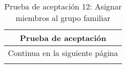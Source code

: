 \begin{longtable}{|p{6.7cm}|p{6.7cm}|}
    \caption{Prueba de aceptación 12: Asignar miembros al grupo familiar} \label{tab:prueba-12}
    \\
    \hline
    \multicolumn{2}{|c|}{\textbf{Prueba de aceptación}}                                                                                                                                                                                                                                                           \\
    \hline

    \endfirsthead

    \hline
    \endhead

    \hline
    \multicolumn{2}{|c|}{{Continua en la siguiente página}}                                                                                                                                                                                                                                                       \\
    \hline
    \endfoot


\end{longtable}
